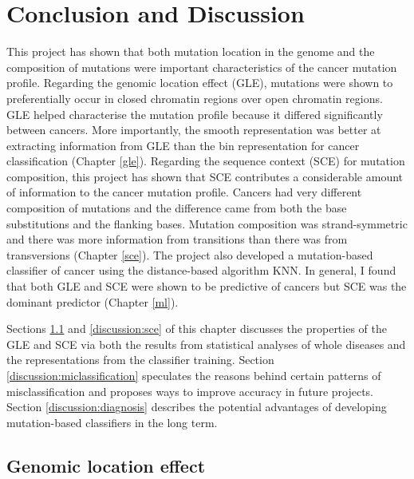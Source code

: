 \newpage
\chapter{Conclusion and Discussion}\label{discussion}

This project has shown that both mutation location in the genome and the composition of mutations were important characteristics of the cancer mutation profile. Regarding the genomic location effect (GLE), mutations were shown to preferentially occur in closed chromatin regions over open chromatin regions. GLE helped characterise the mutation profile because it differed significantly between cancers. More importantly, the smooth representation was better at extracting information from GLE than the bin representation for cancer classification (Chapter \ref{gle}). Regarding the sequence context (SCE) for mutation composition, this project has shown that SCE contributes a considerable amount of information to the cancer mutation profile. Cancers had very different composition of mutations and the difference came from both the base substitutions and the flanking bases. Mutation composition was strand-symmetric and there was more information from transitions than there was from transversions (Chapter \ref{sce}). The project also developed a mutation-based classifier of cancer using the distance-based algorithm KNN. In general, I found that both GLE and SCE were shown to be predictive of cancers but SCE was the dominant predictor (Chapter \ref{ml}). 

Sections \ref{discussion:gle} and \ref{discussion:sce} of this chapter discusses the properties of the GLE and SCE via both the results from statistical analyses of whole diseases and the representations from the classifier training. Section \ref{discussion:miclassification} speculates the reasons behind certain patterns of misclassification and proposes ways to improve accuracy in future projects. Section \ref{discussion:diagnosis} describes the potential advantages of developing mutation-based classifiers in the long term.

\section{Genomic location effect}\label{discussion:gle}
